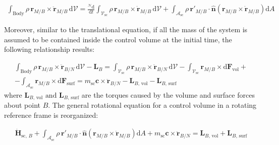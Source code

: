 \begin{multline}
	\int_{\text{Body}}  \rho\,\bm{r}_{M/B} \times \ddot{\bm{r}}_{M/B}\,\text{d}\mathcal{V}  = \frac{^\mathcal{N}\text{d}}{\text{d}t} \int_{\mathcal{V}_{\text{sc}}} \rho\,\bm{r}_{M/B} \times \dot{\bm{r}}_{M/B}\,\text{d}\mathcal{V} + \int_{\mathcal{A}_{\text{sc}}} \rho\,\bm{r}'_{M/B} \cdot\bm{\hat{n}} \left(\bm{r}_{M/B} \times \dot{\bm{r}}_{M/B}\right)\text{d}A
\end{multline}

Moreover, similar to the translational equation, if all the mass of the system is assumed to be contained inside the control volume at the initial time, the following relationship results:

\begin{multline}
	\int_{\text{Body}} \rho\,\bm{r}_{M/B} \times \ddot{\bm{r}}_{B/N}\,\text{d}\mathcal{V} -  \bm{L}_{B}=  \int_{\mathcal{V}_{\text{sc}}} \rho\,\bm{r}_{M/B} \times \ddot{\bm{r}}_{B/N}\,\text{d}\mathcal{V} -  \int_{\mathcal{V}_{\text{sc}}}\bm{r}_{M/B} \times \text{d}\bm{F}_{\text{vol}} +\\- \int_{\mathcal{A}_{\text{sc}}} \bm{r}_{M/B} \times\text{d}\bm{F}_{\text{surf}} = {m}_{\text{sc}} \bm{c} \times \ddot{\bm{r}}_{B/N}-\bm{L}_{B,\,\text{vol}}-\bm{L}_{B,\,\text{surf}}
\end{multline}
\noindent
where $\bm{L}_{B,\,\text{vol}}\text{ and }\bm{L}_{B,\,\text{surf}}$ are the torques caused by the volume and surface forces about point $B$. The general rotational equation for a control volume in a rotating reference frame is reorganized:

\begin{multline}\label{eq:eq36}
	\dot{\bm{H}}_{\text{sc, }B} + \int_{\mathcal{A}_{\text{sc}}} \rho\,\bm{r}'_{M/B} \cdot\bm{\hat{n}} \left(\bm{r}_{M/B} \times \dot{\bm{r}}_{M/B}\right)\text{d}A +{m}_{\text{sc}} \bm{c} \times \ddot{\bm{r}}_{B/N}=\bm{L}_{B,\,\text{vol}}+\bm{L}_{B,\,\text{surf}}
\end{multline}


